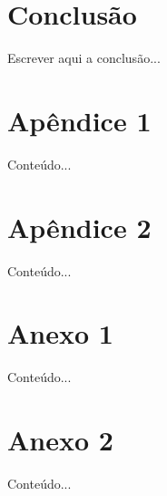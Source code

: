 \documentclass[
	12pt,				%
	openany,			%
	oneside,			%
	a4paper,			%
	english,			%
	french,				%
	spanish,			%
	brazil				%
	]{abntex2}
\begin{document}
\chapter{Conclusão}

Escrever aqui a conclusão...

\postextual



%
%


\begin{apendicesenv}

\partapendices

\chapter{Apêndice 1}

Conteúdo...

\chapter{Apêndice 2}

Conteúdo...

\end{apendicesenv}



\begin{anexosenv}

\partanexos

\chapter{Anexo 1}
Conteúdo...
\chapter{Anexo 2}

Conteúdo...

\end{anexosenv}

\printindex
\end{document}
